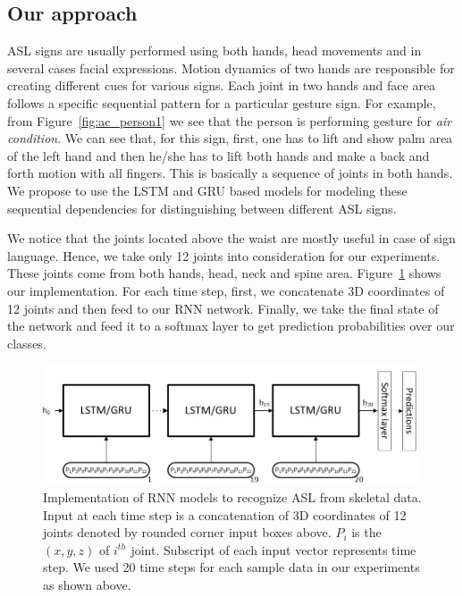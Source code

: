 \documentclass[10pt,twocolumn,letterpaper]{article}
\begin{document}
\subsection{Our approach}
ASL signs are usually performed using both hands, head movements and in several  
cases facial expressions. 
Motion dynamics of 
two hands are responsible for creating different cues for various signs. Each joint in two hands and face area follows a specific sequential pattern for a particular gesture sign. For example, from Figure~\ref{fig:ac_person1} we see that 
the person is performing gesture for \textit{air condition}. We can see that, for this sign, first, one has to lift and show palm area of the left hand and then he/she has to lift both hands and make a back and forth motion with all fingers. This is basically a sequence of joints in both hands. We propose to use the LSTM and GRU based models for modeling these 
sequential dependencies for distinguishing between different ASL signs. 

We notice that the joints located above the waist are mostly useful in case of sign language. Hence, we take only 12 joints into
consideration for  our experiments. These joints come from both hands, head, neck and spine area. Figure~\ref{fig:rnn_impl} shows our implementation. For each time step, first, we concatenate 3D coordinates of 12 joints and then feed to our RNN network. Finally, we take the final state of the network and feed 
it to a softmax layer to 
get prediction probabilities over our classes.

\begin{figure}[h]
	\begin{center}
		\includegraphics[width=.8\linewidth]{rnn_impl}
	\end{center}
	\caption{Implementation of RNN models to recognize ASL from skeletal data. Input at each time step is a concatenation of 3D coordinates of 12 joints denoted by rounded corner input boxes above. $P_i$ is the $(x, y, z)$ of $i^{th}$ joint. Subscript of each input vector represents time step. We used 20 time steps for each sample data in our experiments as shown above.}
	\label{fig:rnn_impl}
\end{figure}
\end{document}

